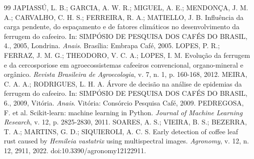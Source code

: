 \documentclass[11pt,a4paper]{article}
\begin{document}
\begin{thebibliography}{99}
 JAPIASSÚ, L. B.; GARCIA, A. W. R.; MIGUEL, A. E.; MENDONÇA, J. M. A.; CARVALHO, C. H. S.; FERREIRA, R. A.; MATIELLO, J. B. Influência da carga pendente, do espaçamento e de fatores climáticos no desenvolvimento da ferrugem do cafeeiro. In: SIMPÓSIO DE PESQUISA DOS CAFÉS DO BRASIL, 4., 2005, Londrina. \textit{Anais}. Brasília: Embrapa Café, 2005.
 LOPES, P. R.; FERRAZ, J. M. G.; THEODORO, V. C. A.; LOPES, I. M. Evolução da ferrugem e da cercosporiose em agroecossistemas cafeeiros convencional, organo-mineral e orgânico. \textit{Revista Brasileira de Agroecologia}, v. 7, n. 1, p. 160-168, 2012.
 MEIRA, C. A. A.; RODRIGUES, L. H. A. Árvore de decisão na análise de epidemias da ferrugem do cafeeiro. In: SIMPÓSIO DE PESQUISA DOS CAFÉS DO BRASIL, 6., 2009, Vitória. \textit{Anais}. Vitória: Consórcio Pesquisa Café, 2009.
 PEDREGOSA, F. et al. Scikit-learn: machine learning in Python. \textit{Journal of Machine Learning Research}, v. 12, p. 2825-2830, 2011.
 SOARES, A. S.; VIEIRA, B. S.; BEZERRA, T. A.; MARTINS, G. D.; SIQUIEROLI, A. C. S. Early detection of coffee leaf rust caused by \textit{Hemileia vastatrix} using multispectral images. \textit{Agronomy}, v. 12, n. 12, 2911, 2022. doi:10.3390/agronomy12122911.
\end{thebibliography}

\vspace{1em}
\begin{center}
\end{center}
\end{document}
